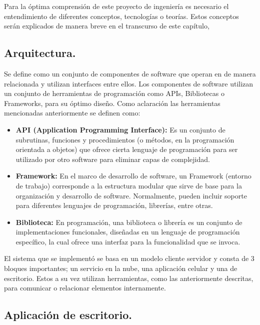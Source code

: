 
Para la óptima comprensión de este proyecto de ingeniería es necesario el entendimiento de diferentes conceptos, tecnologías o teorías. Estos conceptos serán explicados de manera breve en el transcurso de este capítulo, 

\subsection{Arquitectura.}
Se define como un conjunto de componentes de software que operan en de manera relacionada y utilizan interfaces entre ellos. Los componentes de software utilizan un conjunto de herramientas de programación como APIs, Bibliotecas o Frameworks, para su óptimo diseño. Como aclaración las herramientas mencionadas anteriormente se definen como: 
\begin{itemize}
	\item \textbf{API (Application Programming Interface):} Es un conjunto de subrutinas, funciones y procedimientos (o métodos, en la programación orientada a objetos) que ofrece cierta lenguaje de programación para ser utilizado por otro software para eliminar capas de complejidad.
	
	\item \textbf{Framework:} En el marco de desarrollo de software, un Framework (entorno de trabajo) corresponde a la estructura  modular que sirve de base para la organización y desarrollo de software. Normalmente, pueden incluir soporte para diferentes lenguajes de programación, librerías, entre otras. 
	\item \textbf{Biblioteca:} En programación, una biblioteca o librería es un conjunto de implementaciones funcionales, diseñadas en un lenguaje de programación específico, la cual ofrece una interfaz para la funcionalidad que se invoca.
\end{itemize}

El sistema que se implementó se basa en un modelo cliente servidor y consta de 3 bloques importantes; un servicio en la nube, una aplicación celular y una de escritorio. Estos a su vez utilizan herramientas, como las anteriormente descritas, para comunicar o relacionar elementos internamente.

\subsection{Aplicación de escritorio.} 

